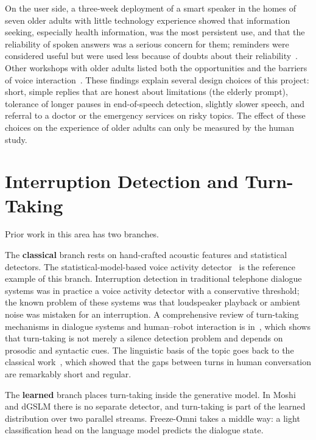 On the user side, a three-week deployment of a smart speaker in the homes of seven
older adults with little technology experience showed that information seeking,
especially health information, was the most persistent use, and that the
reliability of spoken answers was a serious concern for them; reminders were
considered useful but were used less because of doubts about their
reliability~\cite{pradhan2020olderadults}. Other workshops with older adults listed
both the opportunities and the barriers of voice interaction~\cite{kowalski2019olderadults}.
These findings explain several design choices of this project: short, simple replies
that are honest about limitations (the elderly prompt), tolerance of longer pauses in
end-of-speech detection, slightly slower speech, and referral to a doctor or the
emergency services on risky topics. The effect of these choices on the experience of
older adults can only be measured by the human study.

\section{Interruption Detection and Turn-Taking}
\label{sec:bargein-lit}

Prior work in this area has two branches.

The \textbf{classical} branch rests on hand-crafted acoustic features and statistical
detectors. The statistical-model-based voice activity detector~\cite{sohn1999vad} is
the reference example of this branch. Interruption detection in traditional telephone
dialogue systems was in practice a voice activity detector with a conservative
threshold; the known problem of these systems was that loudspeaker playback or
ambient noise was mistaken for an interruption. A comprehensive review of turn-taking
mechanisms in dialogue systems and human--robot interaction is
in~\cite{skantze2021turntaking}, which shows that turn-taking is not merely a silence
detection problem and depends on prosodic and syntactic cues. The linguistic basis of
the topic goes back to the classical work~\cite{sacks1974turntaking}, which showed that
the gaps between turns in human conversation are remarkably short and regular.

The \textbf{learned} branch places turn-taking inside the generative model. In Moshi
and dGSLM there is no separate detector, and turn-taking is part of the learned
distribution over two parallel streams. Freeze-Omni takes a middle way: a light
classification head on the language model predicts the dialogue state.

